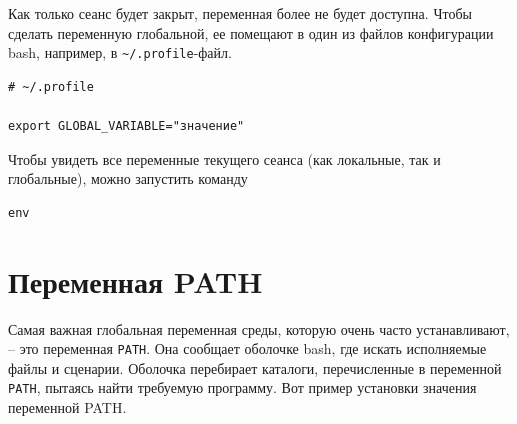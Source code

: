\documentclass[a4paper,12pt,final,openany]{extbook}
\begin{document}
Как только сеанс будет закрыт, переменная более не будет доступна.
Чтобы сделать переменную глобальной, ее помещают в один из файлов
конфигурации bash, например, в \texttt{\textasciitilde{}/.profile}-файл.

\begin{verbatim}
# ~/.profile

export GLOBAL_VARIABLE="значение"
\end{verbatim}

Чтобы увидеть все переменные текущего сеанса (как локальные, так и
глобальные), можно запустить команду

\begin{verbatim}
env
\end{verbatim}







\hypertarget{PATH-variable}{%
\section{\texorpdfstring{\protect\hyperlink{PATH-variable}{}Переменная
PATH}{Переменная PATH}}\label{PATH-variable}}

Самая важная глобальная переменная среды, которую очень часто
устанавливают, -- это переменная \texttt{PATH}. Она сообщает оболочке
bash, где искать исполняемые файлы и сценарии. Оболочка перебирает
каталоги, перечисленные в переменной \texttt{PATH}, пытаясь найти
требуемую программу. Вот пример установки значения переменной PATH.
\end{document}
